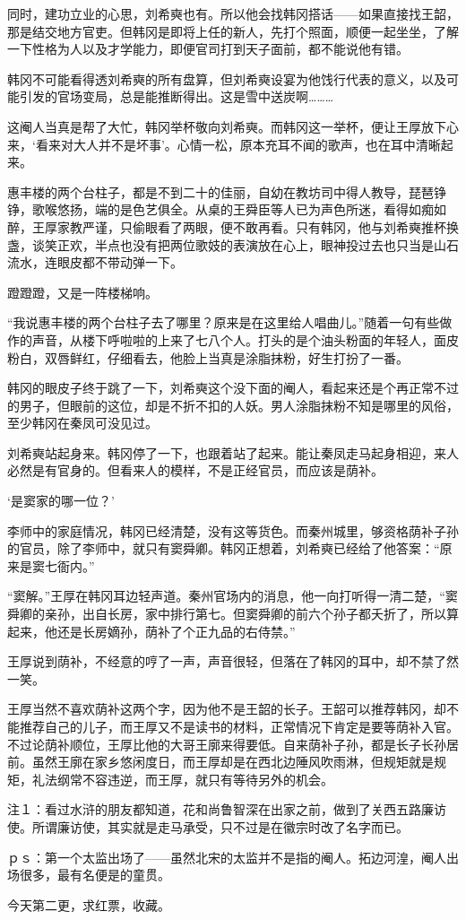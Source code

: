 同时，建功立业的心思，刘希奭也有。所以他会找韩冈搭话——如果直接找王韶，那是结交地方官吏。但韩冈是即将上任的新人，先打个照面，顺便一起坐坐，了解一下性格为人以及才学能力，即便官司打到天子面前，都不能说他有错。

韩冈不可能看得透刘希奭的所有盘算，但刘希奭设宴为他饯行代表的意义，以及可能引发的官场变局，总是能推断得出。这是雪中送炭啊………

这阉人当真是帮了大忙，韩冈举杯敬向刘希奭。而韩冈这一举杯，便让王厚放下心来，‘看来对大人并不是坏事’。心情一松，原本充耳不闻的歌声，也在耳中清晰起来。

惠丰楼的两个台柱子，都是不到二十的佳丽，自幼在教坊司中得人教导，琵琶铮铮，歌喉悠扬，端的是色艺俱全。从桌的王舜臣等人已为声色所迷，看得如痴如醉，王厚家教严谨，只偷眼看了两眼，便不敢再看。只有韩冈，他与刘希奭推杯换盏，谈笑正欢，半点也没有把两位歌妓的表演放在心上，眼神投过去也只当是山石流水，连眼皮都不带动弹一下。

蹬蹬蹬，又是一阵楼梯响。

“我说惠丰楼的两个台柱子去了哪里？原来是在这里给人唱曲儿。”随着一句有些做作的声音，从楼下呼啦啦的上来了七八个人。打头的是个油头粉面的年轻人，面皮粉白，双唇鲜红，仔细看去，他脸上当真是涂脂抹粉，好生打扮了一番。

韩冈的眼皮子终于跳了一下，刘希奭这个没下面的阉人，看起来还是个再正常不过的男子，但眼前的这位，却是不折不扣的人妖。男人涂脂抹粉不知是哪里的风俗，至少韩冈在秦凤可没见过。

刘希奭站起身来。韩冈停了一下，也跟着站了起来。能让秦凤走马起身相迎，来人必然是有官身的。但看来人的模样，不是正经官员，而应该是荫补。

‘是窦家的哪一位？’

李师中的家庭情况，韩冈已经清楚，没有这等货色。而秦州城里，够资格荫补子孙的官员，除了李师中，就只有窦舜卿。韩冈正想着，刘希奭已经给了他答案：“原来是窦七衙内。”

“窦解。”王厚在韩冈耳边轻声道。秦州官场内的消息，他一向打听得一清二楚，“窦舜卿的亲孙，出自长房，家中排行第七。但窦舜卿的前六个孙子都夭折了，所以算起来，他还是长房嫡孙，荫补了个正九品的右侍禁。”

王厚说到荫补，不经意的哼了一声，声音很轻，但落在了韩冈的耳中，却不禁了然一笑。

王厚当然不喜欢荫补这两个字，因为他不是王韶的长子。王韶可以推荐韩冈，却不能推荐自己的儿子，而王厚又不是读书的材料，正常情况下肯定是要等荫补入官。不过论荫补顺位，王厚比他的大哥王廓来得要低。自来荫补子孙，都是长子长孙居前。虽然王廓在家乡悠闲度日，而王厚却是在西北边陲风吹雨淋，但规矩就是规矩，礼法纲常不容违逆，而王厚，就只有等待另外的机会。

注１：看过水浒的朋友都知道，花和尚鲁智深在出家之前，做到了关西五路廉访使。所谓廉访使，其实就是走马承受，只不过是在徽宗时改了名字而已。

ｐｓ：第一个太监出场了——虽然北宋的太监并不是指的阉人。拓边河湟，阉人出场很多，最有名便是的童贯。

今天第二更，求红票，收藏。

